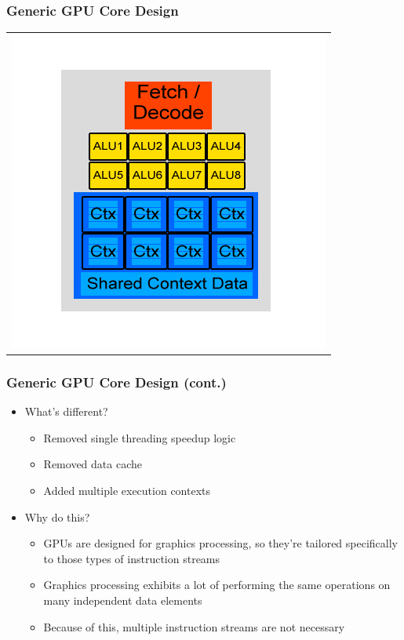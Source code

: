 \documentclass{beamer}
\begin{document}
\begin{frame}
	\frametitle{Generic GPU Core Design}
	\begin{tabular}{c}
		\includegraphics[width=.75\textwidth]{GPU-Design.jpg}
	\end{tabular}
\end{frame}

\begin{frame}
	\frametitle{Generic GPU Core Design (cont.)}
	\begin{itemize}
		\item What's different?
		\begin{itemize}
			\item Removed single threading speedup logic
			\item Removed data cache
			\item Added multiple execution contexts
		\end{itemize}
		\item Why do this?
		\begin{itemize}
			\item GPUs are designed for graphics processing, so they're tailored specifically to those types of instruction streams
			\item Graphics processing exhibits a lot of performing the same operations on many independent data elements
			\item Because of this, multiple instruction streams are not necessary
		\end{itemize}
	\end{itemize}
\end{frame}
\end{document}
